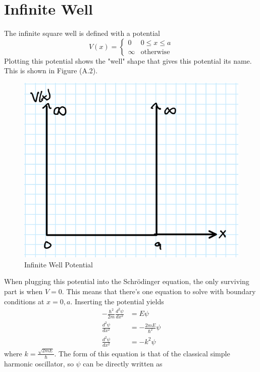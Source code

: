 \section{Infinite Well}
The infinite square well is defined with a potential 
\begin{equation}
    V(x)=\begin{cases} 0 & 0\leq x \leq a\\
                       \infty & \text{otherwise}
        \end{cases}
\end{equation}
Plotting this potential shows the "well" shape that gives this potential its name. This is shown in Figure (A.2).
\begin{figure}
    \centering
    \includegraphics[scale=0.5]{figures/pdf/infsqpot.PNG}
    \caption{Infinite Well Potential}
    \label{fig: Infinite Well Potential}
\end{figure}
When plugging this potential into the Schr\"odinger equation, the only surviving part is when $V=0$. This means that there's one equation to solve with boundary conditions at $x=0,a$. Inserting the potential yields
\begin{align}
    -\frac{\hbar^2}{2m}\frac{d^2\psi}{dx^2}&=E\psi\nonumber\\
    \frac{d^2\psi}{dx^2}&=-\frac{2mE}{\hbar^2}\psi\nonumber\\
    \frac{d^2\psi}{dx^2}&=-k^2\psi
\end{align}
where $k=\frac{\sqrt{2mE}}{\hbar}$. The form of this equation is that of the classical simple harmonic oscillator, so $\psi$ can be directly written as 
